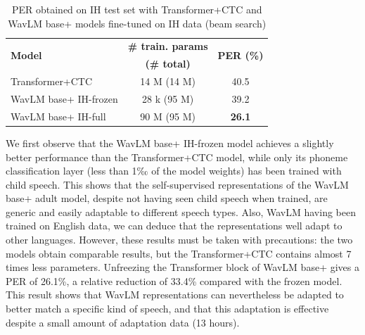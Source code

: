 \documentclass{Interspeech2024}
\begin{document}
\vspace{-0.2cm}
\begin{table}[htbp]
  \caption{PER obtained on IH test set with Transformer+CTC and WavLM base+ models fine-tuned on IH data (beam search)}
  \label{tab:beam-results}
  \centering
  \begin{tabular}{|l|c|c|}
    \hline
    \multirow{2}{*}{\textbf{Model}} & \textbf{\# train. params} & \multirow{2}{*}{\textbf{PER (\%)}} \\
    & \textbf{(\# total)} & \\
    \hline
	Transformer+CTC & 14 M (14 M) & 40.5 \\
    \hline
    WavLM base+ IH-frozen & 28 k \hspace{4pt} (95 M) & 39.2 \\
    WavLM base+ IH-full & 90 M (95 M) & \textbf{26.1}\\
    \hline
  \end{tabular}
\end{table}
\vspace{-0.2cm}
We first observe that the WavLM base+ IH-frozen model achieves a slightly better performance than the Transformer+CTC model, while only its phoneme classification layer (less than 1‰ of the model weights) has been trained with child speech. This shows that the self-supervised representations of the WavLM base+ adult model, despite not having seen child speech when trained, are generic and easily adaptable to different speech types. Also, WavLM having been trained on English data, we can deduce that the representations well adapt to other languages. However, these results must be taken with precautions: the two models obtain comparable results, but the Transformer+CTC contains almost 7 times less parameters.
Unfreezing the Transformer block of WavLM base+ gives a PER of 26.1\%, a relative reduction of 33.4\% compared with the frozen model. This result shows that WavLM representations can nevertheless be adapted to better match a specific kind of speech, and that this adaptation is effective despite a small amount of adaptation data (13 hours).
\end{document}
